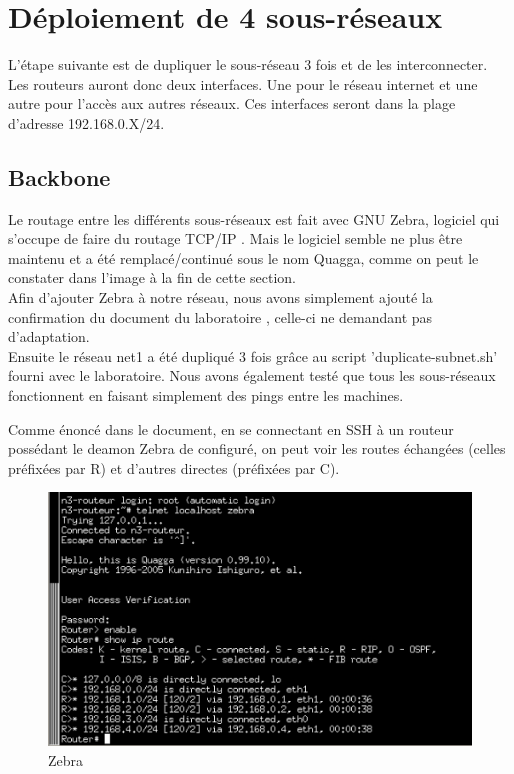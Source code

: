 \documentclass{article}
\begin{document}
\clearpage

\section{Déploiement de 4 sous-réseaux}
L'étape suivante est de dupliquer le sous-réseau 3 fois et de les interconnecter. Les routeurs auront donc deux interfaces. Une pour le réseau internet et une autre pour l'accès aux autres réseaux. Ces interfaces seront dans la plage d'adresse 192.168.0.X/24.\\

\subsection{Backbone}
Le routage entre les différents sous-réseaux est fait avec GNU Zebra, logiciel qui s'occupe de faire du routage TCP/IP \cite{Zebra}. Mais le logiciel semble ne plus être maintenu et a été remplacé/continué sous le nom Quagga, comme on peut le constater dans l'image à la fin de cette section.\\

Afin d'ajouter Zebra à notre réseau, nous avons simplement ajouté la confirmation du document du laboratoire \cite{doc-labo}, celle-ci ne demandant pas d'adaptation.\\

Ensuite le réseau net1 a été dupliqué 3 fois grâce au script 'duplicate-subnet.sh' fourni avec le laboratoire. Nous avons également testé que tous les sous-réseaux fonctionnent en faisant simplement des pings entre les machines.

Comme énoncé dans le document, en se connectant en SSH à un routeur possédant le deamon Zebra de configuré, on peut voir les routes échangées (celles préfixées par R) et d'autres directes (préfixées par C).

\begin{figure}[!h]
	\centering
	\includegraphics{./captures/zebra-check.png}
	\caption{Zebra}
	\label{fig:Zebra}
\end{figure}
\end{document}
